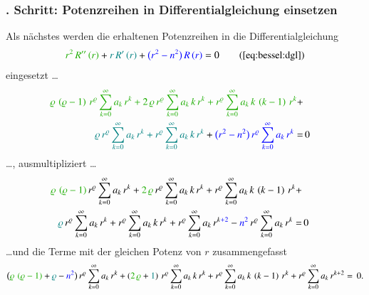 \subsubsection{. Schritt: Potenzreihen in Differentialgleichung  einsetzen}
Als n\"achstes werden die erhaltenen Potenzreihen in die Differentialgleichung
\begin{align*}
	\textcolor{mygreen}{r^2 \, R'' \left( r \right)}
	+
	\textcolor{teal}{r \, R' \left( r \right)}
	+
	\textcolor{blue}{\big( r^2 - n^2 \big) \, R \left( r \right)}
	=
	0
	\tag{\ref{eq:bessel:dgl}}
\end{align*}
eingesetzt \dots
\begin{align*}	
	\textcolor{mygreen}{
		\varrho \, \left( \varrho - 1 \right) \, r^{\varrho}
		\sum_{k=0}^{\infty} a_k \, r^k
		+
		2 \, \varrho \, r^{\varrho}
		\sum_{k=0}^{\infty} a_k \, k \, r^k
		+
		r^{\varrho}
		\sum_{k=0}^{\infty} a_k \, k \, \left( k - 1 \right) \, r^k
	}
	+ \\
	\textcolor{teal}{
		\varrho \, r^{\varrho}
		\sum_{k=0}^{\infty} a_k \, r^k
		+
		r^{\varrho}
		\sum_{k=0}^{\infty} a_k \, k \, r^k
	}
	+ 
	\textcolor{blue}{
		\big(
		r^2 - n^2
		\big) \,
		r^{\varrho}
		\sum_{k=0}^{\infty} a_k \, r^k
	}
	= & \, 0
\end{align*}
\dots , ausmultipliziert \dots
\begin{align*}
	\textcolor{mygreen}{	\varrho \, \left( \varrho - 1 \right)} 
	\, r^{\varrho}
	\sum_{k=0}^{\infty} a_k \, r^k
	+
	\textcolor{mygreen}{2 \, \varrho}
	\, r^{\varrho}
	\sum_{k=0}^{\infty} a_k \, k \, r^k
	+
	r^{\varrho}
	\sum_{k=0}^{\infty} a_k \, k \, \left( k - 1 \right) \, r^k
	+ \\
	\textcolor{teal}{\varrho}
	\, r^{\varrho}
	\sum_{k=0}^{\infty} a_k \, r^k
	+
	r^{\varrho}
	\sum_{k=0}^{\infty} a_k \, k \, r^k
	+
	r^{\varrho}
		\sum_{k=0}^{\infty} a_k \, r^{k \textcolor{blue}{+ 2}}
	-
	\textcolor{blue}{n^2}
	\, r^{\varrho}
	\sum_{k=0}^{\infty} a_k \, r^k
	= & \, 0
\end{align*}
\dots und die Terme mit der gleichen Potenz von $r$ zusammengefasst
\begin{align}
	\big(
	\textcolor{mygreen}{\varrho \, \left( \varrho - 1 \right)}
	+ 
	\textcolor{teal}{\varrho}
	-
	\textcolor{blue}{n^2}
	\big)
	\, r^{\varrho}
	\sum_{k=0}^{\infty} a_k \, r^k
	+ 
	\left(
	\textcolor{mygreen}{2 \, \varrho}
	+
	\textcolor{teal}{1}
	\right)
	\, r^{\varrho}
	\sum_{k=0}^{\infty} a_k \, k \, r^k
	+
	r^{\varrho}
	\sum_{k=0}^{\infty} a_k \, k \, \left( k - 1 \right) \, r^k
	+ 
	r^{\varrho}
	\sum_{k=0}^{\infty} a_k \, r^{k + 2}
	= \, 0
	\label{eq:bessel:potenzreihe:dgl:vereinfacht}
	\text{.}
\end{align}
